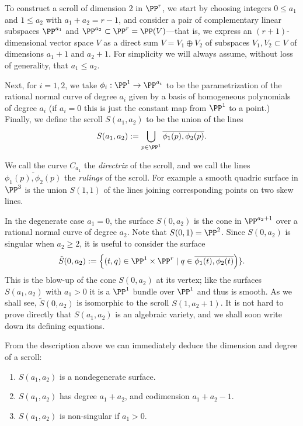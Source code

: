 To construct a scroll of dimension 2 in $\PP^r$, we start by choosing integers $0\leq a_1$ and  $1\leq a_2$ with $a_1 + a_2 = r-1$, and consider  a pair of complementary linear subspaces $\PP^{a_1}$ and $\PP^{a_2} \subset \PP^r = \PP(V)$---that is, we express an $(r+1)$-dimensional vector space $V$ as a direct sum $V =  V_1 \oplus V_2$ of subspaces $V_1, V_2 \subset V$ of dimensions $a_1+1$ and $a_2+1$. For simplicity we will always assume, without loss of
generality, that $a_{1}\leq a_{2}$.

Next, for $i=1,2$, we take $\phi_i : \PP^1 \to \PP^{a_i}$ to be the parametrization of the rational normal curve of degree $a_i$ given by a basis of homogeneous polynomials of degree $a_i$ (if $a_i = 0$ this is just the constant map from $\PP^1$ to a point.) Finally, we define the scroll $S(a_1, a_2)$ to be the union of the lines
$$
S(a_1,a_2) := \bigcup_{p\in \PP^1} \overline{\phi_1(p), \phi_2(p)}.
$$

We call the curve $C_{a_{1}}$ the \emph{directrix} of the scroll, and we call the lines $ \overline{\phi_1(p), \phi_2(p)}$ the \emph{rulings} of the scroll. For example a smooth quadric surface in $\PP^3$ is the union $S(1,1)$ of the lines joining corresponding points on two skew lines. 


In the degenerate case $a_{1}= 0$, the surface $S(0,a_{2})$ is the cone
in $\PP^{a_{2}+1}$ over a rational normal curve of degree $a_{2}$. Note that $S(0,1) = \PP^{2}$. Since $S(0,a_2)$ is singular when $a_2\geq 2$, it is useful to consider the surface
$$
\tilde S(0, a_2) := \left\{ (t, q) \in \PP^1 \times \PP^r  \mid q \in \overline{\phi_1(t), \phi_2(t)}\right)\}.
$$
This is the blow-up of the cone $S(0, a_2)$ at its vertex; like the surfaces $S(a_1,a_2)$ with $a_1 > 0$ it is a $\PP^1$ bundle over $\PP^1$ and thus is smooth. As we shall see, $\tilde S(0, a_2)$ is isomorphic to the scroll $S(1, a_2+1)$.
It is not hard to prove directly that $S(a_1,a_2)$ is an algebraic variety, and we shall soon write down its defining equations.

From the description above we can immediately deduce the dimension and degree of a scroll:

\begin{proposition}
\begin{enumerate}
\item $S(a_1,a_2)$ is a nondegenerate surface.
 \item $S(a_1,a_2)$ has degree $a_1+a_2$, and codimension $a_1+a_2-1.$
 \item $S(a_{1},a_{2})$ is non-singular if $a_{1}>0$.
 \end{enumerate}
\end{proposition}\label{deg and codim}

